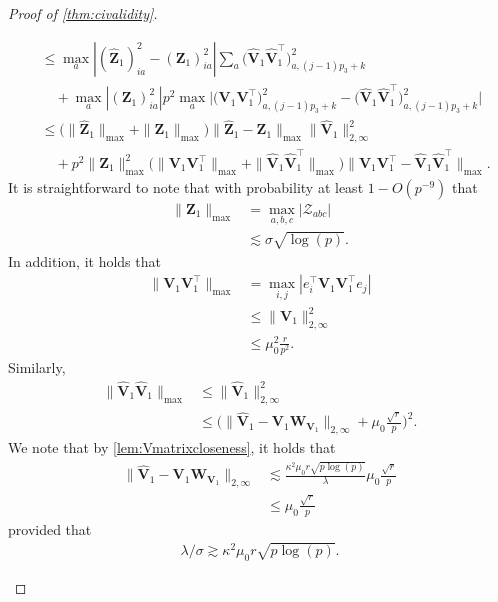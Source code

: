 \documentclass[10pt]{article}
\newcommand{\0}{{\mathbf{0}}}
\newcommand{\1}{{\mathbf{1}}}
\renewcommand{\t}{^{\top}}
\renewcommand{\hat}{\widehat}
\renewcommand{\hat}{\widehat}
\begin{document}
\begin{proof}[Proof of \cref{thm:civalidity}]
\begin{itemize}
\begin{align}
    &\leq \max_{a} | (\mathbf{\hat Z}_1)_{ia}^2 - (\mathbf{Z}_1)_{ia}^2 | \sum_a \big(\mathbf{\hat V}_1 \mathbf{\hat V}_1\t \big)_{a,(j-1)p_3 + k}^2 \nonumber\\
    &\quad + \max_a | (\mathbf{Z}_1 )_{ia}^2 | p^2 \max_{a} \bigg| \big(\mathbf{V}_1 \mathbf{V}_1\t\big)^2_{a,(j-1)p_3 + k} - \big(\mathbf{\hat V}_1 \mathbf{\hat V}_1\t\big)^2_{a,(j-1)p_3 + k} \bigg|\nonumber \\
    &\leq \bigg( \| \mathbf{\hat Z}_1 \|_{\max} + \| \mathbf{Z}_1 \|_{\max} \bigg) \| \mathbf{\hat Z}_1 - \mathbf{Z}_1 \|_{\max} \| \mathbf{\hat V}_1 \|_{2,\infty}^2 \nonumber\\
    &\quad + p^2 \| \mathbf{Z}_1 \|_{\max}^2 \bigg( \| \mathbf{V}_1 \mathbf{V}_1\t \|_{\max} + \| \mathbf{\hat V}_1 \mathbf{\hat V}_1\t \|_{\max} \bigg) \| \mathbf{V}_1 \mathbf{V}_1\t - \mathbf{\hat V}_1 \mathbf{\hat V}_1\t \|_{\max}. \label{v1v2closeness}
\end{align}
It is straightforward to  note that with probability at least $1 - O(p^{-9})$ that
\begin{align*}
    \| \mathbf{Z}_1 \|_{\max} &= \max_{a,b,c} | \mathcal{Z}_{abc} | \\
    &\lesssim \sigma \sqrt{\log(p)}.
\end{align*}
In addition, it holds that
\begin{align*}
    \| \mathbf{V}_1 \mathbf{V}_1\t \|_{\max} &= \max_{i,j} | e_i\t \mathbf{V}_1 \mathbf{V}_1\t e_j | \\
    &\leq \| \mathbf{V}_1 \|_{2,\infty}^2 \\
    &\leq \mu_0^2 \frac{r}{p^2}.
\end{align*}
Similarly,
\begin{align*}
    \| \mathbf{\hat V}_1 \mathbf{\hat V}_1 \|_{\max} &\leq \| \mathbf{\hat V}_1 \|_{2,\infty}^2 \\
    &\leq \bigg( \| \mathbf{\hat V}_1 - \mathbf{V}_1 \mathbf{W}_{\mathbf{V}_1} \|_{2,\infty} + \mu_0 \frac{\sqrt{r}}{p} \bigg)^2.
\end{align*}
We  note that by \cref{lem:Vmatrixcloseness}, it holds that
\begin{align*}
  \| \mathbf{\hat V}_1 - \mathbf{V}_1 \mathbf{W}_{\mathbf{V}_1} \|_{2,\infty} &\lesssim \frac{ \kappa^2 \mu_0 r \sqrt{p\log(p)}}{\lambda} \mu_0 \frac{\sqrt{r}}{p} \\
  &\leq \mu_0 \frac{\sqrt{r}}{p}
\end{align*}
provided that 
\begin{align}
    \lambda/\sigma \gtrsim \kappa^2 \mu_0 r \sqrt{p\log(p)}. \label{snrcondition}

\end{align}
\end{itemize}
\end{proof}
\end{document}

